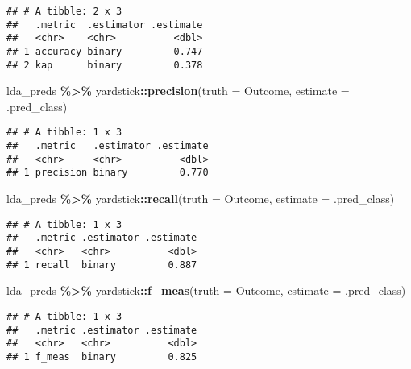 \documentclass[
]{article}
\newenvironment{Shaded}{\begin{snugshade}}{\end{snugshade}}
\newcommand{\AttributeTok}[1]{\textcolor[rgb]{0.13,0.29,0.53}{#1}}
\newcommand{\FunctionTok}[1]{\textcolor[rgb]{0.13,0.29,0.53}{\textbf{#1}}}
\newcommand{\NormalTok}[1]{#1}
\newcommand{\SpecialCharTok}[1]{\textcolor[rgb]{0.81,0.36,0.00}{\textbf{#1}}}
\begin{document}
\begin{verbatim}
## # A tibble: 2 x 3
##   .metric  .estimator .estimate
##   <chr>    <chr>          <dbl>
## 1 accuracy binary         0.747
## 2 kap      binary         0.378
\end{verbatim}

\begin{Shaded}
\begin{Highlighting}[]
\NormalTok{lda\_preds }\SpecialCharTok{\%\textgreater{}\%}
\NormalTok{  yardstick}\SpecialCharTok{::}\FunctionTok{precision}\NormalTok{(}\AttributeTok{truth =}\NormalTok{ Outcome, }\AttributeTok{estimate =}\NormalTok{ .pred\_class)}
\end{Highlighting}
\end{Shaded}

\begin{verbatim}
## # A tibble: 1 x 3
##   .metric   .estimator .estimate
##   <chr>     <chr>          <dbl>
## 1 precision binary         0.770
\end{verbatim}

\begin{Shaded}
\begin{Highlighting}[]
\NormalTok{lda\_preds }\SpecialCharTok{\%\textgreater{}\%}
\NormalTok{  yardstick}\SpecialCharTok{::}\FunctionTok{recall}\NormalTok{(}\AttributeTok{truth =}\NormalTok{ Outcome, }\AttributeTok{estimate =}\NormalTok{ .pred\_class)}
\end{Highlighting}
\end{Shaded}

\begin{verbatim}
## # A tibble: 1 x 3
##   .metric .estimator .estimate
##   <chr>   <chr>          <dbl>
## 1 recall  binary         0.887
\end{verbatim}

\begin{Shaded}
\begin{Highlighting}[]
\NormalTok{lda\_preds }\SpecialCharTok{\%\textgreater{}\%}
\NormalTok{  yardstick}\SpecialCharTok{::}\FunctionTok{f\_meas}\NormalTok{(}\AttributeTok{truth =}\NormalTok{ Outcome, }\AttributeTok{estimate =}\NormalTok{ .pred\_class)}
\end{Highlighting}
\end{Shaded}

\begin{verbatim}
## # A tibble: 1 x 3
##   .metric .estimator .estimate
##   <chr>   <chr>          <dbl>
## 1 f_meas  binary         0.825
\end{verbatim}
\end{document}
